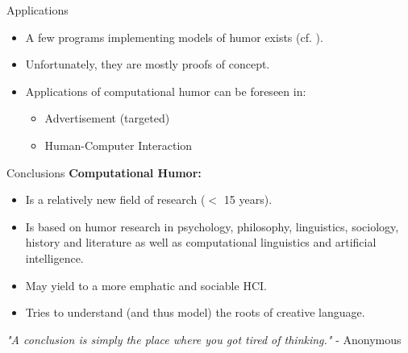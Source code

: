 \begin{frame}[t,fragile]{Applications}
\begin{large}
\begin{itemize}
  \item A few programs implementing  models of humor exists (cf. \cite{mulder2002humour} \cite{nijholt2012computational}).
  \vskip20pt
  \item Unfortunately, they are mostly proofs of concept.
  \vskip20pt
  \item Applications of computational humor can be foreseen in:
  \begin{itemize}
    \item Advertisement (targeted)
    \item Human-Computer Interaction
  \end{itemize}
\end{itemize}
\end{large}
\end{frame}


\begin{frame}[t,fragile]{Conclusions}
{\Large \textbf{Computational Humor:}}
\begin{itemize}
  \item Is a relatively new field of research ($<$ 15 years).
  \item Is based on humor research in psychology, philosophy, linguistics, sociology, history and literature as well as computational linguistics and artificial intelligence.
  \item May yield to a more emphatic and sociable HCI.
  \item Tries to understand (and thus model) the roots of creative language. 
\end{itemize}
\vskip20pt
\begin{center}
\textit{"A conclusion is simply the place where you got tired of thinking."} - Anonymous
\end{center}
\end{frame}
 
